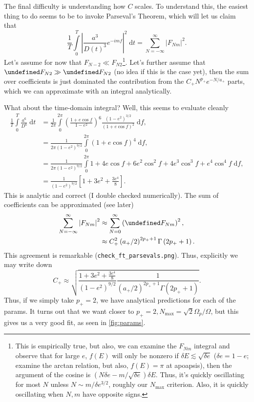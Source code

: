 \documentclass[11pt,
        usenames, %
        dvipsnames %
    ]{article}
\newcommand*{\abs}[1]{\left|#1\right|}
\newcommand*{\p}[1]{\left(#1\right)}
\newcommand*{\s}[1]{\left[#1\right]}
\let\Re\undefined
\let\Im\undefined
\DeclareMathOperator{\Re}{Re}
\DeclareMathOperator{\Im}{Im}
\begin{document}
The final difficulty is understanding how $C$ scales. To understand this, the
easiest thing to do seems to be to invoke Parseval's Theorem, which will let us
claim that
\begin{equation}
    \frac{1}{T}\int\limits_{0}^T \abs{\frac{a^3}{D(t)^3}e^{-imf}}^2
            \;\mathrm{d}t =
        \sum\limits_{N = -\infty}^\infty \abs{F_{Nm}}^2.
\end{equation}
Let's assume for now that $F_{N-2} \ll F_{N2}$\footnote{This is empirically
true, but also, we can examine the $F_{Nm}$ integral and observe that for large
$e$, $f(E)$ will only be nonzero if $\delta E \lesssim \sqrt{\delta e}$
($\delta e = 1 - e$; examine the arctan relation, but also, $f(E) = \pi$ at
apoapsis), then the argument of the cosine is $\p{N \delta e - m/\sqrt{\delta
e}} \delta E$. Thus, it's quickly oscillating for most $N$ unless $N \sim
m/\delta e^{3/2}$, roughly our $N_{\max}$ criterion. Also, it is quickly
oscillating when $N, m$ have opposite signs.}. Let's further assume that $\Re
F_{N2} \gg \Im F_{N2}$ (no idea if this is the case yet), then the sum over
coefficients is just dominated the contribution from the $C_+ N^{p_+}e^{-N/a_+}$
parts, which we can approximate with an integral analytically.

What about the time-domain integral? Well, this seems to evaluate cleanly
\begin{align}
    \frac{1}{T}\int\limits_0^T \frac{a^6}{D^6}\;\mathrm{d}t &= \frac{1}{2\pi}
        \int\limits_{0}^{2\pi} \p{\frac{1 + e\cos f}{1 - e^2}}^6
            \frac{\p{1 - e^2}^{3/2}}{\p{1 + e\cos f}^2}\;\mathrm{d}f,\\
        &= \frac{1}{2\pi\p{1 - e^2}^{9/2}}\int\limits_0^{2\pi}
            \p{1 + e\cos f}^4\;\mathrm{d}f,\\
        &= \frac{1}{2\pi\p{1 - e^2}^{9/2}}\int\limits_0^{2\pi}
            1 + 4e\cos f + 6e^2\cos^2f + 4e^3\cos^3f + e^4\cos^4f\;\mathrm{d}f
                ,\\
        &= \frac{1}{\p{1 - e^2}^{9/2}}\s{
            1 + 3e^2 + \frac{3e^4}{8}}.
\end{align}
This is analytic and correct (I double checked numerically). The sum of
coefficients can be approximated (see later)
\begin{align}
    \sum\limits_{N = -\infty}^\infty \abs{F_{Nm}}^2 &\approx
            \sum\limits_{N = 0}^\infty \p{\Re F_{Nm}}^2,\\
        &\approx C_+^2 \p{a_+ / 2}^{2p_+ + 1}\Gamma\p{2 p_+ + 1}.
\end{align}
This agreement is remarkable (\lstinline{check_ft_parsevals.png}). Thus,
explicitly we may write down
\begin{equation}
    C_+ \approx \sqrt{\frac{ 1 + 3e^2 + \frac{3e^4}{8}}{\p{1 - e^2}^{9/2}}
        \frac{1}{\p{a_+/2}^{2p_+ + 1} \Gamma\p{2 p_+ + 1}}}.
\end{equation}
Thus, if we simply take $p_+ = 2$, we have analytical predictions for each of
the params. It turns out that we want closer to $p_+ = 2, N_{\max} =
\sqrt{2}\Omega_p/\Omega$, but this gives us a very good fit, as seen in
\autoref{fig:params}.
\end{document}
